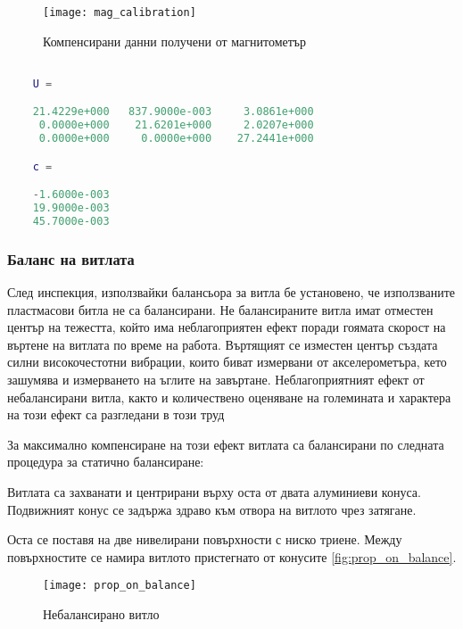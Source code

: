 \begin{figure}[htpb!]
    \centering
    \texttt{[image: mag\_calibration]}
    \caption{Компенсирани данни получени от магнитометър}
    \label{fig:mag_calibration}
\end{figure}

\begin{lstlisting}[language=matlab, caption={Получени трансформация елипсоид-сфера и отместване на център}, label={lst:mag_cal_trans}]

    U =

    21.4229e+000   837.9000e-003     3.0861e+000
     0.0000e+000    21.6201e+000     2.0207e+000
     0.0000e+000     0.0000e+000    27.2441e+000

    c =

    -1.6000e-003
    19.9000e-003
    45.7000e-003

\end{lstlisting}

\subsubsection{Баланс на витлата}

След инспекция, използвайки балансьора за витла бе установено, че използваните пластмасови битла не са балансирани.
Не балансираните витла имат отместен център на тежестта, който има неблагоприятен ефект поради гоямата скорост на въртене на витлата по време на работа.
Въртящият се изместен център създата силни високочестотни вибрации, които биват измервани от акселерометъра, кето зашумява и измерването на ъглите на завъртане.
Неблагоприятният ефект от небалансирани витла, както и количествено оценяване на големината и характера на този ефект са разгледани в този труд \cite{prop_balance}

За максимално компенсиране на този ефект витлата са балансирани по следната процедура за статично балансиране:

Витлата са захванати и центрирани върху оста от двата алуминиеви конуса. 
Подвижният конус се задържа здраво към отвора на витлото чрез затягане.

Оста се поставя на две нивелирани повърхности с ниско триене.
Между повърхностите се намира витлото пристегнато от конусите \autoref{fig:prop_on_balance}.

\begin{figure}[htpb!]
    \centering
    \texttt{[image: prop\_on\_balance]}
    \caption{Небалансирано витло}
    \label{fig:prop_on_balance}
\end{figure}

